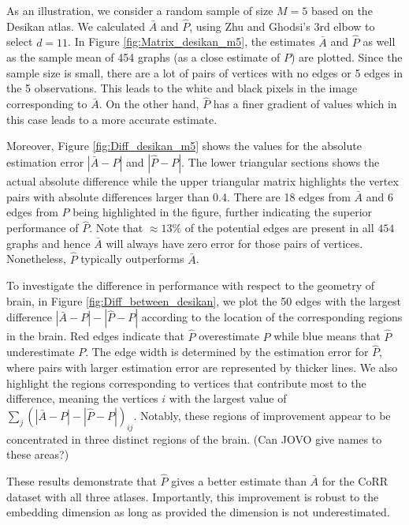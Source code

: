 \documentclass[a4paper]{article}
\begin{document}
As an illustration, we consider a random sample of size $M=5$ based on the Desikan atlas.
We calculated $\bar{A}$ and $\hat{P}$, using  Zhu and Ghodsi's 3rd elbow to select $d=11$. 
In Figure \ref{fig:Matrix_desikan_m5}, the estimates $\bar{A}$ and $\hat{P}$ as well as the sample mean of 454 graphs (as a close estimate of $P$) are plotted. 
Since the sample size is small, there are a lot of pairs of vertices with no edges or 5 edges in the 5 observations.
This leads to the white and black pixels in the image corresponding to $\bar{A}$.
On the other hand, $\hat{P}$ has a finer gradient of values which in this case leads to a more accurate estimate.

Moreover, Figure \ref{fig:Diff_desikan_m5} shows the values for the absolute estimation error $|\bar{A} - P|$ and $|\hat{P}-P|$. The lower triangular sections shows the actual absolute difference while the upper triangular matrix highlights the vertex pairs with absolute differences larger than 0.4. 
There are 18 edges from $\bar{A}$ and 6 edges from $\hat{P}$ being highlighted in the figure, further indicating the superior performance of $\hat{P}$.
Note that $\approx 13\%$ of the potential edges are present in all $454$ graphs and hence $\bar{A}$ will always have zero error for those pairs of vertices.
Nonetheless, $\hat{P}$ typically outperforms $\bar{A}$.

To investigate the difference in performance with respect to the geometry of brain, 
in Figure \ref{fig:Diff_between_desikan}, we plot the 50 edges with the largest difference $|\bar{A} - P| - |\hat{P} - P|$ according to the location of the corresponding regions in the brain. Red edges indicate that $\hat{P}$ overestimate $P$ while blue means that $\hat{P}$ underestimate $P$. The edge width is determined by the estimation error for $\hat{P}$, where pairs with larger estimation error are represented by thicker lines.
We also highlight the regions corresponding to vertices that contribute most to the difference, meaning the vertices $i$ with the largest value of $\sum_j (|\bar{A} - P| - |\hat{P} - P|)_{ij}$.
Notably, these regions of improvement appear to be concentrated in three distinct regions of the brain.
{\color{red}(Can JOVO give names to these areas?)}


These results demonstrate that $\hat{P}$ gives a better estimate than $\bar{A}$ for the CoRR dataset with all three atlases. 
Importantly, this improvement is robust to the embedding dimension as long as provided the dimension is not underestimated.
\end{document}
